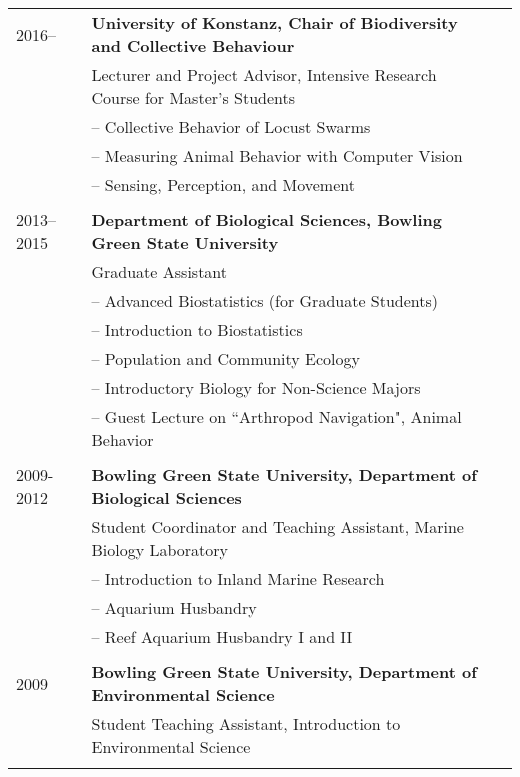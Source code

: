 \documentclass[letterpaper,10pt,oneside]{article}
\begin{document}
\begin{longtable}{@{} l p{5.3in}l}
 \large{2016–}
    & \textbf{University of Konstanz, Chair of Biodiversity and Collective Behaviour} \\
     & Lecturer and Project Advisor, Intensive Research Course for Master's Students \\
   	 & – Collective Behavior of Locust Swarms \\
     & – Measuring Animal Behavior with Computer Vision \\
     & – Sensing, Perception, and Movement \\
     & \\
 \large{2013–2015}
 & \textbf{Department of Biological Sciences, Bowling Green State University} \\
 & Graduate Assistant \\
 & – Advanced Biostatistics (for Graduate Students)\\
 & – Introduction to Biostatistics \\
 & – Population and Community Ecology \\
 & – Introductory Biology for Non-Science Majors \\
 & – Guest Lecture on ``Arthropod Navigation", Animal Behavior \\
 & \\
 \large{2009-2012}
 & \textbf{Bowling Green State University, Department of Biological Sciences} \\
 & Student Coordinator and Teaching Assistant, Marine Biology Laboratory \\
 & – Introduction to Inland Marine Research \\
 & – Aquarium Husbandry \\
 & – Reef Aquarium Husbandry I and II \\
 & \\
 \large{2009}
 & \textbf{Bowling Green State University, Department of Environmental Science} \\
 & Student Teaching Assistant, Introduction to Environmental Science \\
 & \\
 

\end{longtable}
\end{document}
